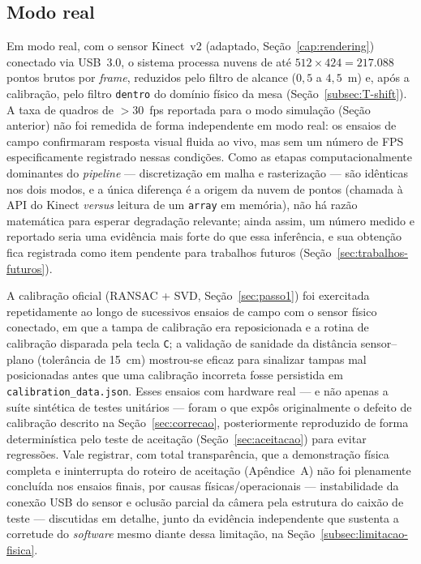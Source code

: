 \subsection{Modo real}

Em modo real, com o sensor Kinect~v2 (adaptado, Seção~\ref{cap:rendering})
conectado via USB~3.0, o sistema processa nuvens de até
$512 \times 424 = 217{.}088$ pontos brutos por \textit{frame}, reduzidos
pelo filtro de alcance ($0{,}5$ a $4{,}5$~m) e, após a calibração, pelo
filtro \texttt{dentro} do domínio físico da mesa
(Seção~\ref{subsec:T-shift}). A taxa de quadros de $>30$~fps reportada
para o modo simulação (Seção anterior) não foi remedida de forma
independente em modo real: os ensaios de campo confirmaram resposta
visual fluida ao vivo, mas sem um número de FPS especificamente
registrado nessas condições. Como as etapas computacionalmente
dominantes do \textit{pipeline} — discretização em malha e rasterização
— são idênticas nos dois modos, e a única diferença é a origem da nuvem
de pontos (chamada à API do Kinect \textit{versus} leitura de um
\texttt{array} em memória), não há razão matemática para esperar
degradação relevante; ainda assim, um número medido e reportado seria
uma evidência mais forte do que essa inferência, e sua obtenção fica
registrada como item pendente para trabalhos futuros
(Seção~\ref{sec:trabalhos-futuros}).

A calibração oficial (RANSAC + SVD,
Seção~\ref{sec:passo1}) foi exercitada repetidamente ao longo de
sucessivos ensaios de campo com o sensor físico conectado, em que a
tampa de calibração era reposicionada e a rotina de calibração
disparada pela tecla \texttt{C}; a validação de sanidade da distância
sensor--plano (tolerância de 15~cm) mostrou-se eficaz para sinalizar
tampas mal posicionadas antes que uma calibração incorreta fosse
persistida em \texttt{calibration\_data.json}. Esses ensaios com
hardware real — e não apenas a suíte sintética de testes unitários —
foram o que expôs originalmente o defeito de calibração descrito na
Seção~\ref{sec:correcao}, posteriormente reproduzido de forma
determinística pelo teste de aceitação (Seção~\ref{sec:aceitacao}) para
evitar regressões. Vale registrar, com total transparência, que a
demonstração física completa e ininterrupta do roteiro de aceitação
(Apêndice~A) não foi plenamente concluída nos ensaios finais, por
causas físicas/operacionais — instabilidade da conexão USB do sensor e
oclusão parcial da câmera pela estrutura do caixão de teste — discutidas
em detalhe, junto da evidência independente que sustenta a corretude
do \textit{software} mesmo diante dessa limitação, na
Seção~\ref{subsec:limitacao-fisica}.

